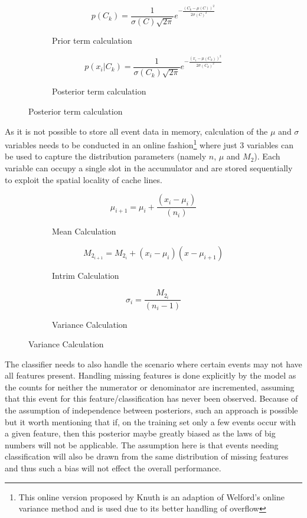 \documentclass[a4paper,11pt]{scrreprt}
\begin{document}
\begin{figure}[h!]
\begin{subfigure}[t]{2.5 in}
\[p(C_k) = \frac{1}{\sigma(C)\sqrt{2\pi}}e^{-\frac{(C_k - \mu(C))^2}{2\sigma(C)^2}}\]
\caption{Prior term calculation}
\end{subfigure}
\begin{subfigure}[t]{2.5 in}
\[p(x_i | C_k) = \frac{1}{\sigma(C_k)\sqrt{2\pi}}e^{-\frac{(x_i - \mu(C_k))^2}{2\sigma(C_k)^2}}\]
\caption{Posterior term calculation}
\end{subfigure}
\end{figure}
As it is not possible to store all event data in memory, calculation of the \(\mu\) and \(\sigma\) variables needs to be conducted in an online fashion\footnote{This online version proposed by Knuth\cite{knuth-aop} is an adaption of Welford's online variance method and is used due to its better handling of overflow} where just 3 variables can be used to capture the distribution parameters (namely \(n\), \(\mu\) and \(M_2\)). Each variable can occupy a single slot in the accumulator and are stored sequentially to exploit the spatial locality of cache lines.

\captionsetup[subfigure]{labelfont=bf,textfont=normalfont,singlelinecheck=off,justification=centering,labelformat=simple, labelsep=colon}
\begin{figure}[h!]
\begin{subfigure}[t]{2.5 in}
\[\mu_{i+1} = \mu_i + \frac{(x_i - \mu_i)}{(n_i)}\]
\caption{Mean Calculation}
\end{subfigure}
\begin{subfigure}[t]{2.5 in}
\[M_{2_{i+1}} = M_{2_i} + (x_i - \mu_i)(x - \mu_{i+1})\]
\caption{Intrim Calculation}
\end{subfigure}
\begin{subfigure}[t]{2.5 in}
\[\sigma_i = \frac{M_{2_i}}{(n_i-1)}\]
\caption{Variance Calculation}
\end{subfigure}
\end{figure}

The classifier needs to also handle the scenario where certain events may not have all features present. Handling missing features is done explicitly by the model as the counts for neither the numerator or denominator are incremented, assuming that this event for this feature/classification has never been observed. Because of the assumption of independence between posteriors, such an approach is possible but it worth mentioning that if, on the training set only a few events occur with a given feature, then this posterior maybe greatly biased as the laws of big numbers will not be applicable. The assumption here is that events needing classification will also be drawn from the same distribution of missing features and thus such a bias will not effect the overall performance.
\end{document}
